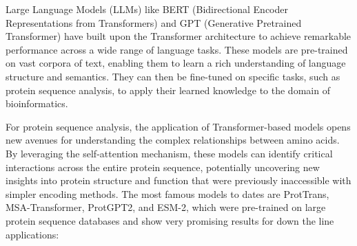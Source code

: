 Large Language Models (LLMs) like BERT (Bidirectional Encoder Representations from Transformers) and GPT (Generative Pretrained Transformer) have built upon the Transformer architecture to achieve remarkable performance across a wide range of language tasks. These models are pre-trained on vast corpora of text, enabling them to learn a rich understanding of language structure and semantics. They can then be fine-tuned on specific tasks, such as protein sequence analysis, to apply their learned knowledge to the domain of bioinformatics. \cite{devlin-etal-2019-bert,NEURIPS2020_1457c0d6}

For protein sequence analysis, the application of Transformer-based models opens new avenues for understanding the complex relationships between amino acids. By leveraging the self-attention mechanism, these models can identify critical interactions across the entire protein sequence, potentially uncovering new insights into protein structure and function that were previously inaccessible with simpler encoding methods. The most famous models to dates are ProtTrans, MSA-Transformer, ProtGPT2, and ESM-2, which were pre-trained on large protein sequence databases and show very promising results for down the line applications:

